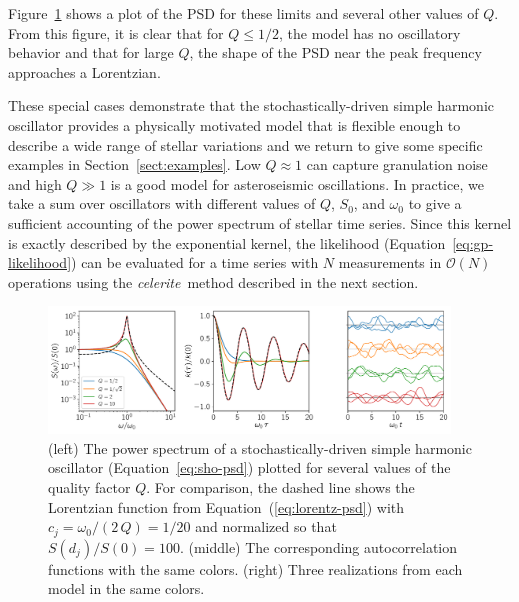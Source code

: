 \documentclass[manuscript, letterpaper]{aastex6}
\makeatletter
\let\origsection\section
\renewcommand\section{\@ifstar{\starsection}{\nostarsection}}
\newcommand\nostarsection[1]{\sectionprelude\origsection{#1}}
\newcommand\starsection[1]{\sectionprelude\origsection*{#1}}
\newcommand\sectionprelude{\vspace{1em}}
\newcommand{\celeriteterm}{\emph{celerite}}
\newcommand{\figureref}[1]{\ref{fig:#1}}
\newcommand{\Figure}[1]{Figure~\figureref{#1}}
\newcommand{\figurelabel}[1]{\label{fig:#1}}
\renewcommand{\eqref}[1]{\ref{eq:#1}}
\newcommand{\Eq}[1]{Equation~(\eqref{#1})}
\newcommand{\eq}[1]{\Eq{#1}}
\newcommand{\eqalt}[1]{Equation~\eqref{#1}}
\newcommand{\sectionname}{Section}
\newcommand{\sectref}[1]{\ref{sect:#1}}
\newcommand{\Sect}[1]{\sectionname~\sectref{#1}}
\newcommand{\sect}[1]{\Sect{#1}}
\newcommand{\sectlabel}[1]{\label{sect:#1}}
\newcommand{\response}[1]{{\color{blue}#1}}
\makeatother
\begin{document}
\Figure{sho} shows a plot of the PSD for these limits and several other values
of $Q$.
From this figure, it is clear that for $Q \le 1/2$, the model has no
oscillatory behavior and that for large $Q$, the shape of the PSD near the
peak frequency approaches a Lorentzian.

These special cases demonstrate that the stochastically-driven simple harmonic
oscillator provides a physically motivated model that is flexible enough to
describe a wide range of stellar variations and we return to give some
specific examples in \sect{examples}.
Low $Q \approx 1$ can capture granulation noise and high $Q \gg 1$ is a good
model for asteroseismic oscillations.
In practice, we take a sum over oscillators with different values of $Q$,
$S_0$, and $\omega_0$ to give a sufficient accounting of the power spectrum
of stellar time series.
Since this kernel is exactly described by the exponential kernel, the
likelihood (\eqalt{gp-likelihood}) can be evaluated for a time series with $N$
measurements in $\mathcal{O}(N)$ operations using the \celeriteterm\ method
described in the next section.

\begin{figure}[!htbp]
\begin{center}
\includegraphics[width=0.95\textwidth]{figures/sho.pdf}
\caption{(left) The power spectrum of a stochastically-driven simple harmonic
    oscillator (\eqalt{sho-psd}) plotted for several values of the quality
    factor $Q$.
    For comparison, the dashed line shows the Lorentzian function from
    \eq{lorentz-psd} with $c_j = \omega_0/(2\,Q) = 1/20$ and normalized so that
    $S(d_j)/S(0) = 100$.
    (middle) The corresponding autocorrelation functions with the same colors.
    \response{(right) Three realizations from each model in the same colors.}
    \figurelabel{sho}}
\end{center}
\end{figure}



\section{Semiseparable matrices \& celerite}\sectlabel{factor}
\end{document}
